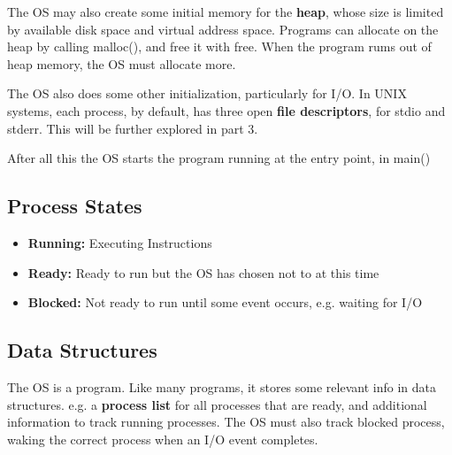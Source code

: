 \documentclass{article}
\begin{document}
The OS may also create some initial memory for the \textbf{heap}, whose size is limited by available disk space and virtual address space.
Programs can allocate on the heap by calling \textsf{malloc()}, and free it with \textsf{free}.
When the program rums out of heap memory, the OS must allocate more.

The OS also does some other initialization, particularly for I/O.
In UNIX systems, each process, by default, has three open \textbf{file descriptors}, for stdio and stderr.
This will be further explored in part 3.

After all this the OS starts the program running at the entry point, in \textsf{main()}

\subsection{Process States}

\begin{itemize}
    \item \textbf{Running:} Executing Instructions
    \item \textbf{Ready:} Ready to run but the OS has chosen not to at this time
    \item \textbf{Blocked:} Not ready to run until some event occurs, e.g. waiting for I/O
\end{itemize}

\subsection{Data Structures}

The OS is a program.
Like many programs, it stores some relevant info in data structures.
e.g. a \textbf{process list} for all processes that are ready, and additional information to track running processes.
The OS must also track blocked process, waking the correct process when an I/O event completes.
\end{document}
